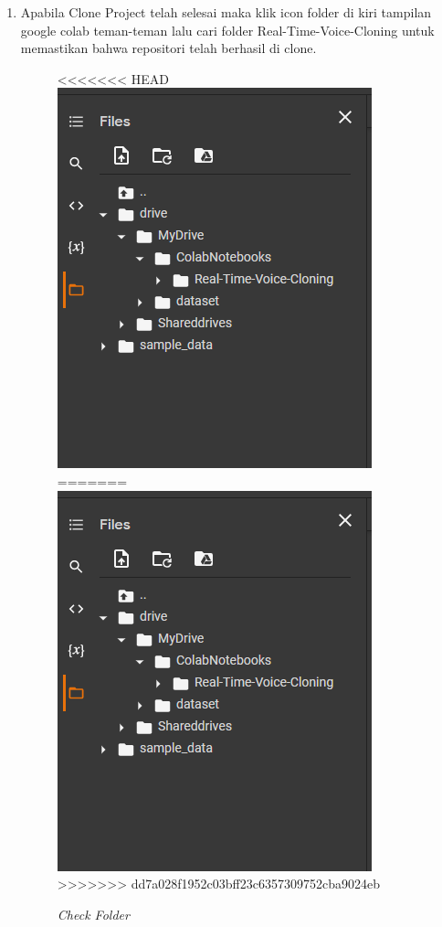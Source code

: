 \begin{enumerate}
\item Apabila Clone Project telah selesai maka klik icon folder di kiri tampilan google colab teman-teman lalu cari folder Real-Time-Voice-Cloning untuk memastikan bahwa repositori telah berhasil di clone.
\begin{figure}[H]
    \centering
<<<<<<< HEAD
    \includegraphics[scale=0.65]{figures/colab7}
=======
    \includegraphics[scale=0.75]{figures/colab7}
>>>>>>> dd7a028f1952c03bff23c6357309752cba9024eb
    \caption{\textit{Check Folder}}
    \label{clab7}
\end{figure}


\end{enumerate}
